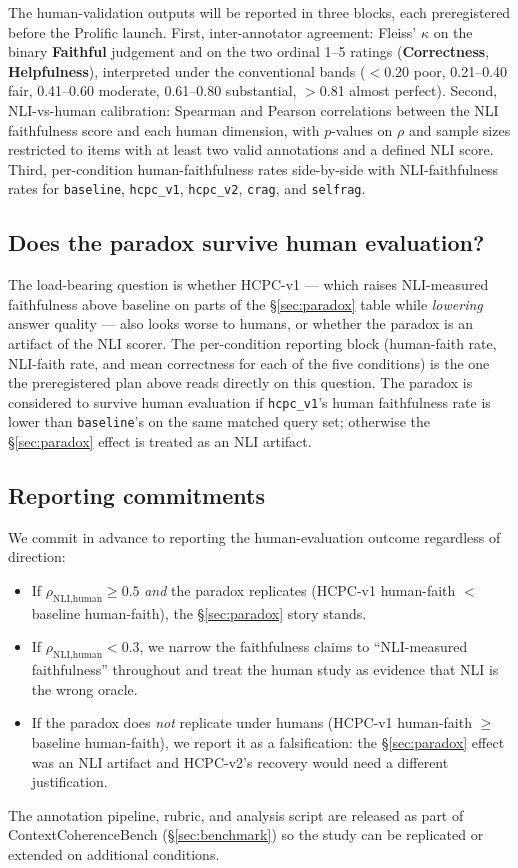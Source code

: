 The human-validation outputs will be reported in three blocks, each
preregistered before the Prolific launch. First, inter-annotator
agreement: Fleiss' $\kappa$ on the binary \textbf{Faithful} judgement
and on the two ordinal 1--5 ratings (\textbf{Correctness},
\textbf{Helpfulness}), interpreted under the conventional bands
($<$0.20 poor, 0.21--0.40 fair, 0.41--0.60 moderate, 0.61--0.80
substantial, $>$0.81 almost perfect). Second, NLI-vs-human calibration:
Spearman and Pearson correlations between the NLI faithfulness score
and each human dimension, with $p$-values on $\rho$ and sample sizes
restricted to items with at least two valid annotations and a defined
NLI score. Third, per-condition human-faithfulness rates side-by-side
with NLI-faithfulness rates for \texttt{baseline}, \texttt{hcpc\_v1},
\texttt{hcpc\_v2}, \texttt{crag}, and \texttt{selfrag}.

\subsection{Does the paradox survive human evaluation?}

The load-bearing question is whether HCPC-v1 — which raises NLI-measured
faithfulness above baseline on parts of the §\ref{sec:paradox} table
while \emph{lowering} answer quality — also looks worse to humans, or
whether the paradox is an artifact of the NLI scorer. The
per-condition reporting block (human-faith rate, NLI-faith rate, and
mean correctness for each of the five conditions) is the one the
preregistered plan above reads directly on this question. The paradox
is considered to survive human evaluation if \texttt{hcpc\_v1}'s human
faithfulness rate is lower than \texttt{baseline}'s on the same matched
query set; otherwise the §\ref{sec:paradox} effect is treated as an NLI
artifact.

\subsection{Reporting commitments}

We commit in advance to reporting the human-evaluation outcome regardless
of direction:

\begin{itemize}
  \item If $\rho_{\text{NLI},\text{human}} \geq 0.5$ \emph{and} the
        paradox replicates (HCPC-v1 human-faith $<$ baseline human-faith),
        the §\ref{sec:paradox} story stands.
  \item If $\rho_{\text{NLI},\text{human}} < 0.3$, we narrow the
        faithfulness claims to ``NLI-measured faithfulness'' throughout
        and treat the human study as evidence that NLI is the wrong
        oracle.
  \item If the paradox does \emph{not} replicate under humans (HCPC-v1
        human-faith $\geq$ baseline human-faith), we report it as a
        falsification: the §\ref{sec:paradox} effect was an NLI
        artifact and HCPC-v2's recovery would need a different
        justification.
\end{itemize}

The annotation pipeline, rubric, and analysis script are released as
part of ContextCoherenceBench (§\ref{sec:benchmark}) so the study can be
replicated or extended on additional conditions.
